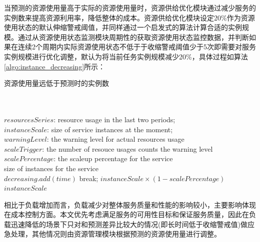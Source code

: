 当预测的资源使用量高于实际的资源使用量时，资源供给优化模块通过减少服务的实例数来提高资源利用率，降低整体的成本。资源供给优化模块设定20\%作为资源使用状态的默认伸缩警戒阈值，并同样通过一个启发式的算法计算合适的实例规模。通过从资源使用状态监测模块周期性的获取资源使用状态监控数据，并判断如果在连续2个周期内实际资源使用状态不低于于收缩警戒阈值少于5次即需要对服务实例规模进行优化调整，默认为将当前任务实例规模减少20\%，具体过程如算法\ref{algo:instance_decreasing}所示：
\begin{algorithm}[H]
\caption{资源使用量远低于预测时的实例数}
\label{algo:instance_decreasing}
\begin{algorithmic}[0]
\\
\Require ~~\
\\
$resourcesSeries$: resource usage in the last two periods;\\
$instanceScale$: size of service instances at the moment;\\
$warningLevel$: the warning level for actual resources usage \\
$scaleTrigger$: the number of resouce usages counts the warning level \\
$scalePercentage$: the scaleup percentage for the service
\Ensure ~~\
\\
size of instances for the service \\

            \State $decreasing.add(time)$
            \State break;
        \EndIf
    \EndFor
        \State \Return $instanceScale \times (1-scalePercentage)$
    \Else
        \State \Return $instanceScale$
    \EndIf
\EndFor
\end{algorithmic}
\end{algorithm}

相比于负载增加而言，负载减少对整体服务质量和性能的影响较小，主要影响体现在成本控制方面。本文优先考虑满足服务的可用性目标和保证服务质量，因此在负载迅速降低的场景下只对和预测差异比较大的情况(即长时间低于收缩警戒值)做应急处理，其他情况则由资源管理模块根据预测的资源使用量进行调整。

